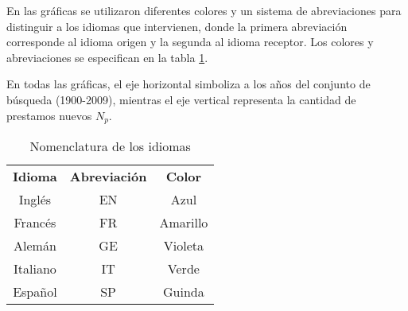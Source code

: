 



En las gráficas se utilizaron diferentes colores y un sistema de abreviaciones para distinguir a los idiomas que intervienen, donde la primera abreviación corresponde al idioma origen y la segunda al idioma receptor. Los colores y abreviaciones se especifican  en la tabla \ref{tab.idcolor}. 

En todas las gráficas, el eje horizontal simboliza a los años del conjunto de búsqueda (1900-2009),  mientras el eje vertical representa la cantidad de prestamos nuevos $N_{p}$. 


\begin{table} %
	\centering
	\begin{tabular}{ccc}
		\textbf{Idioma} & \textbf{Abreviación} & \textbf{Color} \\
		Inglés          & EN                   & Azul           \\
		Francés         & FR                   & Amarillo       \\
		Alemán          & GE                   & Violeta        \\
		Italiano        & IT                   & Verde          \\
		Español         & SP                   & Guinda        
	\end{tabular}
	\caption{Nomenclatura de los idiomas}
	\label{tab.idcolor}
\end{table} %




	


